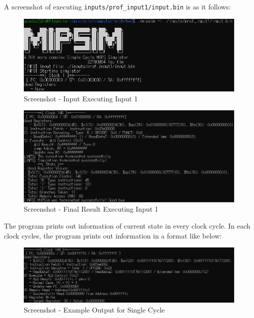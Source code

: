 \documentclass{homework}
\begin{document}
A screenshot of executing \texttt{inputs/prof_input1/input.bin} is as it follows:

\begin{figure}[h]
\begin{center}
\includegraphics[scale=0.8]{screenshot_1.png}    
\caption{Screenshot - Input Executing Input 1}
\end{center}
\end{figure}

\begin{figure}[h]
\begin{center}
\includegraphics[scale=0.7]{screenshot_2.png}    
\caption{Screenshot - Final Result Executing Input 1}
\end{center}
\end{figure}

\pagebreak
The program prints out information of current state in every clock cycle. In each clock cycles, the program prints out information in a format like below:
\begin{figure}[h]
\begin{center}
\includegraphics[scale=0.7]{screenshot_3.png}    
\caption{Screenshot - Example Output for Single Cycle}
\end{center}
\end{figure}
\end{document}
